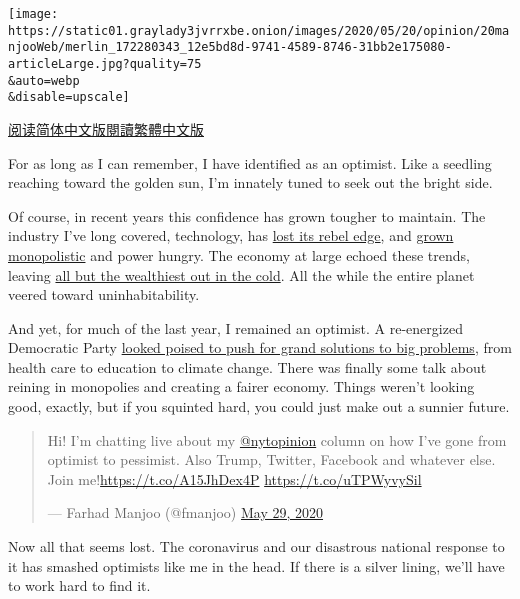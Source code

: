 \texttt{[image: https://static01.graylady3jvrrxbe.onion/images/2020/05/20/opinion/20manjooWeb/merlin\_172280343\_12e5bd8d-9741-4589-8746-31bb2e175080-articleLarge.jpg?quality=75\\\&auto=webp\\\&disable=upscale]}

\href{https://cn.nytimes3xbfgragh.onion/opinion/20200521/coronavirus-worst-case/}{阅读简体中文版}\href{https://cn.nytimes3xbfgragh.onion/opinion/20200521/coronavirus-worst-case/zh-hant/}{閱讀繁體中文版}

For as long as I can remember, I have identified as an optimist. Like a
seedling reaching toward the golden sun, I'm innately tuned to seek out
the bright side.

Of course, in recent years this confidence has grown tougher to
maintain. The industry I've long covered, technology, has
\href{https://www.businessinsider.com/employees-lament-the-open-culture-that-made-google-famous-2020-5}{lost
its rebel edge}, and
\href{https://www.nytimes3xbfgragh.onion/2017/10/18/technology/frightful-five-start-ups.html}{grown
monopolistic} and power hungry. The economy at large echoed these
trends, leaving
\href{https://www.nytimes3xbfgragh.onion/2020/04/09/opinion/sunday/inequality-coronavirus.html}{all
but the wealthiest out in the cold}. All the while the entire planet
veered toward uninhabitability.

And yet, for much of the last year, I remained an optimist. A
re-energized Democratic Party
\href{https://www.nytimes3xbfgragh.onion/2019/06/05/opinion/elizabeth-warren-america.html}{looked
poised to push for grand solutions to big problems}, from health care to
education to climate change. There was finally some talk about reining
in monopolies and creating a fairer economy. Things weren't looking
good, exactly, but if you squinted hard, you could just make out a
sunnier future.

\begin{quote}
Hi! I'm chatting live about my
\href{https://twitter.com/nytopinion?ref_src=twsrc\%5Etfw}{@nytopinion}
column on how I've gone from optimist to pessimist. Also Trump, Twitter,
Facebook and whatever else. Join me!\url{https://t.co/A15JhDex4P}
\url{https://t.co/uTPWyvySil}

--- Farhad Manjoo (@fmanjoo)
\href{https://twitter.com/fmanjoo/status/1266414229713637376?ref_src=twsrc\%5Etfw}{May
29, 2020}
\end{quote}

Now all that seems lost. The coronavirus and our disastrous national
response to it has smashed optimists like me in the head. If there is a
silver lining, we'll have to work hard to find it.


